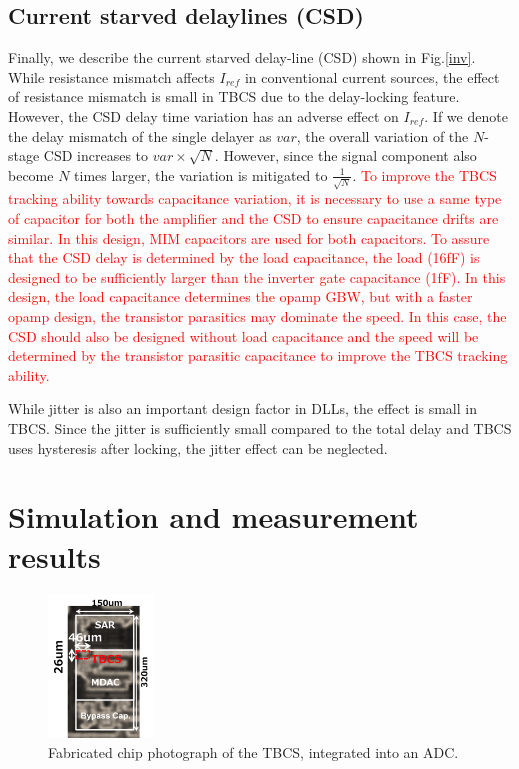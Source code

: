 \documentclass[paper]{ieice}
\begin{document}
\subsection{Current starved delaylines (CSD)}

\qquad Finally, we describe the current starved delay-line (CSD) shown in Fig.\ref{inv}. While resistance mismatch affects $I_{ref}$ in conventional current sources, the effect of resistance mismatch is small in TBCS due to the delay-locking feature. However, the CSD delay time variation has an adverse effect on $I_{ref}$.
If we denote the delay mismatch of the single delayer as $var$, the overall variation of the $N$-stage CSD increases to $var \times \sqrt{N}$. However, since the signal component also become  $N$ times larger, the variation is mitigated to $\frac{1}{\sqrt{N}}$.
\textcolor{red}{To improve the TBCS tracking ability towards capacitance variation, it is necessary to use a same type of capacitor for both the amplifier and the CSD to ensure capacitance drifts are similar. In this design, MIM capacitors are used for both capacitors. To assure that the CSD delay is determined by the load capacitance, the load (16fF) is designed to be sufficiently larger than the inverter gate capacitance (1fF).
In this design, the load capacitance determines the opamp GBW, but with a faster opamp design, the transistor parasitics may dominate the speed. In this case, the CSD should also be designed without load capacitance and the speed will be determined by the transistor parasitic capacitance to improve the TBCS tracking ability.}

While jitter is also an important design factor in DLLs, the effect is small in TBCS. Since the jitter is sufficiently small compared to the total delay and TBCS uses hysteresis after locking, the jitter effect can be neglected.

\section{Simulation and measurement results}
\begin{figure}[!t]
\centering
 \includegraphics[width=0.25\textwidth]{figs/chipphoto.png}
  \caption{Fabricated chip photograph of the TBCS, integrated into an ADC.}
\label{chip}
\end{figure}
\end{document}
